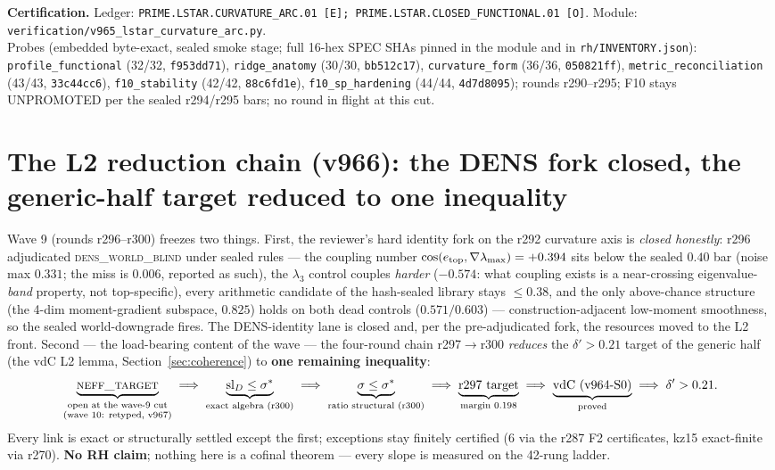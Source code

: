 \documentclass[11pt]{article}
\newcommand{\certbox}[3]{%
  \par\medskip\noindent\colorbox{certgray}{\parbox{\dimexpr\linewidth-2\fboxsep}{%
    \footnotesize\raggedright\textbf{Certification.} Ledger: \texttt{#1}.\quad
    Module: \texttt{#2}.\\ #3}}\par\medskip}
\theoremstyle{definition}
\theoremstyle{remark}
\begin{document}
\certbox{PRIME.LSTAR.CURVATURE\_ARC.01 [E];\
PRIME.LSTAR.CLOSED\_FUNCTIONAL.01 [O]}%
{verification/v965\_lstar\_curvature\_arc.py}%
{Probes (embedded byte-exact, sealed smoke stage; full 16-hex SPEC SHAs
pinned in the module and in \texttt{rh/INVENTORY.json}):
\texttt{profile\_functional} (32/32, \texttt{f953dd71}),
\texttt{ridge\_anatomy} (30/30, \texttt{bb512c17}),
\texttt{curvature\_form} (36/36, \texttt{050821ff}),
\texttt{metric\_reconciliation} (43/43, \texttt{33c44cc6}),
\texttt{f10\_stability} (42/42, \texttt{88c6fd1e}),
\texttt{f10\_sp\_hardening} (44/44, \texttt{4d7d8095});
rounds r290--r295; F10 stays UNPROMOTED per the sealed r294/r295
bars; no round in flight at this cut.}

\section{The L2 reduction chain (v966): the DENS fork closed, the
generic-half target reduced to one inequality}\label{sec:l2chain}

Wave 9 (rounds r296--r300) freezes two things.  First, the reviewer's
hard identity fork on the r292 curvature axis is \emph{closed
honestly}: r296 adjudicated \textsc{dens\_world\_blind} under sealed
rules --- the coupling number $\cos(e_{\rm top}, \nabla\lambda_{\max})
= +0.394$ sits below the sealed $0.40$ bar (noise max $0.331$; the
miss is $0.006$, reported as such), the $\lambda_3$ control couples
\emph{harder} ($-0.574$: what coupling exists is a near-crossing
eigenvalue-\emph{band} property, not top-specific), every arithmetic
candidate of the hash-sealed library stays $\le 0.38$, and the only
above-chance structure (the 4-dim moment-gradient subspace, $0.825$)
holds on both dead controls ($0.571/0.603$) --- construction-adjacent
low-moment smoothness, so the sealed world-downgrade fires.  The
DENS-identity lane is closed and, per the pre-adjudicated fork, the
resources moved to the L2 front.  Second --- the load-bearing content
of the wave --- the four-round chain r297$\to$r300 \emph{reduces} the
$\delta' > 0.21$ target of the generic half (the vdC L2 lemma,
Section~\ref{sec:coherence}) to \textbf{one remaining inequality}:
\[
\underbrace{\textsc{neff\_target}}_{\substack{\text{open at the
wave-9 cut}\\ \text{(wave 10: retyped, v967)}}}
\;\Longrightarrow\;
\underbrace{\mathrm{sl}_D \le \sigma^*}_{\text{exact algebra (r300)}}
\;\Longrightarrow\;
\underbrace{\sigma \le \sigma^*}_{\text{ratio structural (r300)}}
\;\Longrightarrow\;
\underbrace{\text{r297 target}}_{\text{margin } 0.198}
\;\Longrightarrow\;
\underbrace{\text{vdC (v964-S0)}}_{\text{proved}}
\;\Longrightarrow\;
\delta' > 0.21 .
\]
Every link is exact or structurally settled except the first;
exceptions stay finitely certified (6 via the r287 F2 certificates,
kz15 exact-finite via r270).  \textbf{No RH claim}; nothing here is a
cofinal theorem --- every slope is measured on the 42-rung ladder.
\end{document}
